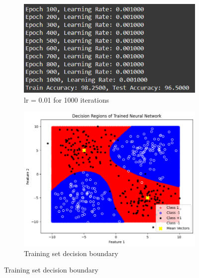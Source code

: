 \documentclass[a4paper,12pt]{article}
\begin{document}
\begin{figure}[H]
    \centering
    \captionsetup[subfigure]{list=true} %

    \begin{subfigure}{0.5\textwidth}
        \centering
        \includegraphics[width=\textwidth]{3.3_.001_1000_r.png}
        \caption{lr = 0.01 for 1000 iterations}
    \end{subfigure}
    \begin{subfigure}{0.45\textwidth}
        \centering
        \includegraphics[width=\textwidth]{3.3_.001_1000_Train.png}
        \caption{Training set decision boundary}
    \end{subfigure}


\end{figure}
\end{document}
